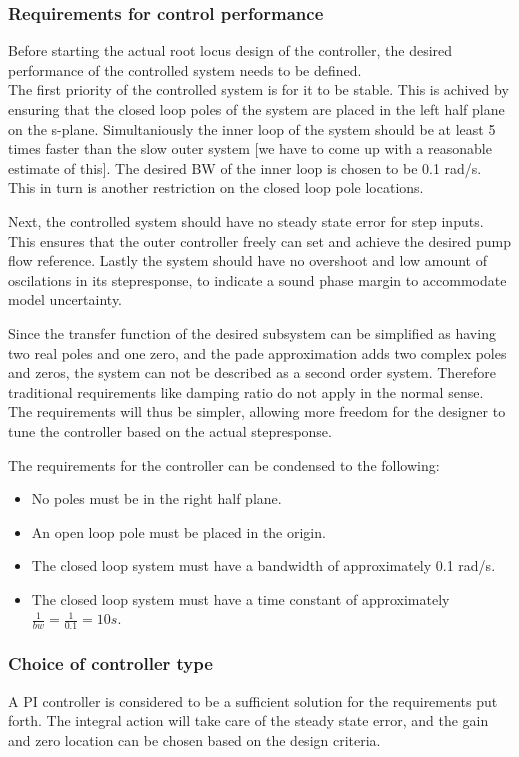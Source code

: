 \subsubsection{Requirements for control performance}
Before starting the actual root locus design of the controller, the desired performance of the controlled system needs to be defined. \\
The first priority of the controlled system is for it to be stable. This is achived by ensuring that the closed loop poles of the system are placed in the left half plane on the s-plane. Simultaniously the inner loop of the system should be at least 5 times faster than the slow outer system [we have to come up with a reasonable estimate of this]. The desired BW of the inner loop is chosen to be 0.1 rad/s. This in turn is another restriction on the closed loop pole locations.

Next, the controlled system should have no steady state error for step inputs. This ensures that the outer controller freely can set and achieve the desired pump flow reference. Lastly the system should have no overshoot and low amount of oscilations in its stepresponse, to indicate a sound phase margin to accommodate model uncertainty.

Since the transfer function of the desired subsystem can be simplified as having two real poles and one zero, and the pade approximation adds two complex poles and zeros, the system can not be described as a second order system. Therefore traditional requirements like damping ratio do not apply in the normal sense. The requirements will thus be simpler, allowing more freedom for the designer to tune the controller based on the actual stepresponse.

The requirements for the controller can be condensed to the following: 
\begin{itemize}
	\item No poles must be in the right half plane.
	\item An open loop pole must be placed in the origin.
	\item The closed loop system must have a bandwidth of approximately 0.1 rad/s.
	\item The closed loop system must have a time constant of approximately $\frac{1}{bw} = \frac{1}{0.1} = 10s$.
\end{itemize}



\subsubsection{Choice of controller type}
A PI controller is considered to be a sufficient solution for the requirements put forth. The integral action will take care of the steady state error, and the gain and zero location can be chosen based on the design criteria.

